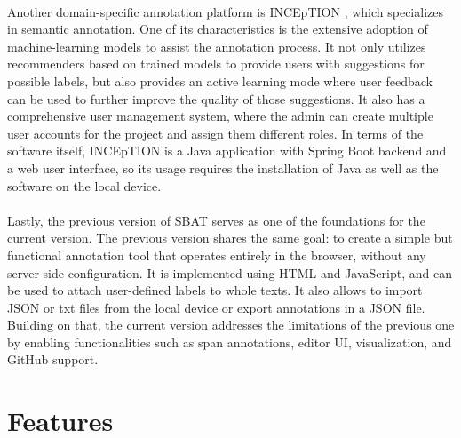 \documentclass[12ptm a4paper]{article}
\begin{document}
\\
Another domain-specific annotation platform is INCEpTION \citep{klie-etal-2018-inception}, which specializes in semantic annotation. One of its characteristics is the extensive adoption of machine-learning models to assist the annotation process. It not only utilizes recommenders based on trained models to provide users with suggestions for possible labels, but also provides an active learning mode where user feedback can be used to further improve the quality of those suggestions. It also has a comprehensive user management system, where the admin can create multiple user accounts for the project and assign them different roles. In terms of the software itself, INCEpTION is a Java application with Spring Boot backend and a web user interface, so its usage requires the installation of Java as well as the software on the local device.\\
\\
Lastly, the previous version of SBAT \citep{SBAT} serves as one of the foundations for the current version. The previous version shares the same goal: to create a simple but functional annotation tool that operates entirely in the browser, without any server-side configuration. It is implemented using HTML and JavaScript, and can be used to attach user-defined labels to whole texts. It also allows to import JSON or txt files from the local device or export annotations in a JSON file. Building on that, the current version addresses the limitations of the previous one by enabling functionalities such as span annotations, editor UI, visualization, and GitHub support.\\
\newpage
\section{Features}
\end{document}
